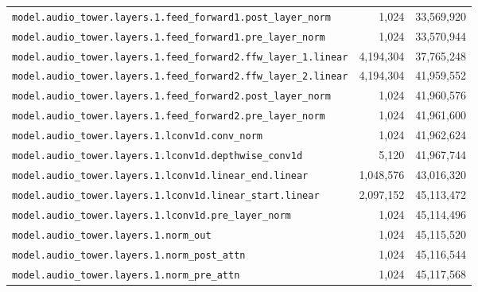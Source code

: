 \documentclass[10pt,a4paper]{article}
\theoremstyle{definition}
\begin{document}
\begin{appendices}
\begin{longtable}{p{9.5cm}rr}
\texttt{model.\allowbreak{}audio\_tower.\allowbreak{}layers.\allowbreak{}1.\allowbreak{}feed\_forward1.\allowbreak{}post\_layer\_norm} & 1,024 & 33,569,920 \\
\texttt{model.\allowbreak{}audio\_tower.\allowbreak{}layers.\allowbreak{}1.\allowbreak{}feed\_forward1.\allowbreak{}pre\_layer\_norm} & 1,024 & 33,570,944 \\
\texttt{model.\allowbreak{}audio\_tower.\allowbreak{}layers.\allowbreak{}1.\allowbreak{}feed\_forward2.\allowbreak{}ffw\_layer\_1.\allowbreak{}linear} & 4,194,304 & 37,765,248 \\
\texttt{model.\allowbreak{}audio\_tower.\allowbreak{}layers.\allowbreak{}1.\allowbreak{}feed\_forward2.\allowbreak{}ffw\_layer\_2.\allowbreak{}linear} & 4,194,304 & 41,959,552 \\
\texttt{model.\allowbreak{}audio\_tower.\allowbreak{}layers.\allowbreak{}1.\allowbreak{}feed\_forward2.\allowbreak{}post\_layer\_norm} & 1,024 & 41,960,576 \\
\texttt{model.\allowbreak{}audio\_tower.\allowbreak{}layers.\allowbreak{}1.\allowbreak{}feed\_forward2.\allowbreak{}pre\_layer\_norm} & 1,024 & 41,961,600 \\
\texttt{model.\allowbreak{}audio\_tower.\allowbreak{}layers.\allowbreak{}1.\allowbreak{}lconv1d.\allowbreak{}conv\_norm} & 1,024 & 41,962,624 \\
\texttt{model.\allowbreak{}audio\_tower.\allowbreak{}layers.\allowbreak{}1.\allowbreak{}lconv1d.\allowbreak{}depthwise\_conv1d} & 5,120 & 41,967,744 \\
\texttt{model.\allowbreak{}audio\_tower.\allowbreak{}layers.\allowbreak{}1.\allowbreak{}lconv1d.\allowbreak{}linear\_end.\allowbreak{}linear} & 1,048,576 & 43,016,320 \\
\texttt{model.\allowbreak{}audio\_tower.\allowbreak{}layers.\allowbreak{}1.\allowbreak{}lconv1d.\allowbreak{}linear\_start.\allowbreak{}linear} & 2,097,152 & 45,113,472 \\
\texttt{model.\allowbreak{}audio\_tower.\allowbreak{}layers.\allowbreak{}1.\allowbreak{}lconv1d.\allowbreak{}pre\_layer\_norm} & 1,024 & 45,114,496 \\
\texttt{model.\allowbreak{}audio\_tower.\allowbreak{}layers.\allowbreak{}1.\allowbreak{}norm\_out} & 1,024 & 45,115,520 \\
\texttt{model.\allowbreak{}audio\_tower.\allowbreak{}layers.\allowbreak{}1.\allowbreak{}norm\_post\_attn} & 1,024 & 45,116,544 \\
\texttt{model.\allowbreak{}audio\_tower.\allowbreak{}layers.\allowbreak{}1.\allowbreak{}norm\_pre\_attn} & 1,024 & 45,117,568 \\

\end{longtable}
\end{appendices}
\end{document}

